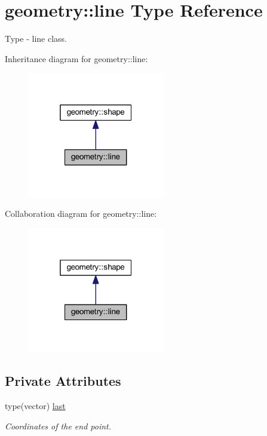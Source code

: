 \hypertarget{structgeometry_1_1line}{}\section{geometry\+:\+:line Type Reference}
\label{structgeometry_1_1line}


Type -\/ line class.  




Inheritance diagram for geometry\+:\+:line\+:\nopagebreak
\begin{figure}[H]
\begin{center}
\leavevmode
\includegraphics[width=169pt]{structgeometry_1_1line__inherit__graph}
\end{center}
\end{figure}


Collaboration diagram for geometry\+:\+:line\+:\nopagebreak
\begin{figure}[H]
\begin{center}
\leavevmode
\includegraphics[width=169pt]{structgeometry_1_1line__coll__graph}
\end{center}
\end{figure}
\subsection*{Private Attributes}
\begin{DoxyCompactItemize}
\item 
type(vector) \hyperlink{structgeometry_1_1line_ab899fb3b6da58896cd14e2f1a474c457}{last}
\begin{DoxyCompactList}\small\item\em Coordinates of the end point. \end{DoxyCompactList}\end{DoxyCompactItemize}


